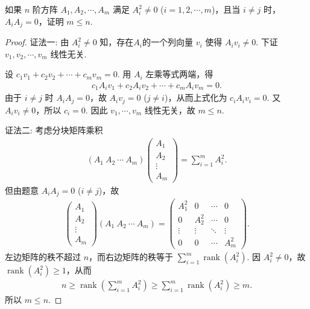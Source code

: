 \documentclass[../../main.tex]{subfiles}%
\begin{document}
\begin{example}
如果 $n$ 阶方阵 $A_1, A_2, \cdots, A_m$ 满足 $A_i^2 \neq 0$ ($i = 1, 2, \cdots, m$)，且当 $i \neq j$ 时，$A_i A_j = 0$，证明 $m \leqslant n$.
\end{example}
\begin{proof}

{\color{blue}证法一:}
由 $A_i^2 \neq 0$ 知，存在$A_i$的一个列向量 $v_i$ 使得 $A_i v_i \neq 0$. 下证 $v_1, v_2, \cdots, v_m$ 线性无关.

设 $c_1 v_1 + c_2 v_2 + \cdots + c_m v_m = 0$. 用 $A_i$ 左乘等式两端，得
\begin{align*}
c_1 A_i v_1 + c_2 A_i v_2 + \cdots + c_m A_i v_m = 0.
\end{align*}
由于 $i \neq j$ 时 $A_i A_j = 0$，故 $A_i v_j = 0$ ($j \neq i$)，从而上式化为 $c_i A_i v_i = 0$. 又 $A_i v_i \neq 0$，所以 $c_i = 0$. 因此 $v_1, \cdots, v_m$ 线性无关，故 $m \leqslant n$.

{\color{blue}证法二:}
考虑分块矩阵乘积
\begin{align*}
(A_1 \ A_2 \ \cdots \ A_m) \begin{pmatrix}
A_1 \\ A_2 \\ \vdots \\ A_m
\end{pmatrix} = \sum_{i=1}^m A_i^2.
\end{align*}
但由题意 $A_i A_j = 0$ ($i \neq j$)，故
\begin{align*}
\begin{pmatrix}
A_1 \\ A_2 \\ \vdots \\ A_m
\end{pmatrix} (A_1 \ A_2 \ \cdots \ A_m) =
\begin{pmatrix}
A_1^2 & 0 & \cdots & 0 \\
0 & A_2^2 & \cdots & 0 \\
\vdots & \vdots & \ddots & \vdots \\
0 & 0 & \cdots & A_m^2
\end{pmatrix}.
\end{align*}
左边矩阵的秩不超过 $n$，而右边矩阵的秩等于 $\sum_{i=1}^m \operatorname{rank}(A_i^2)$. 因 $A_i^2 \neq 0$，故 $\operatorname{rank}(A_i^2) \geqslant 1$，从而
\begin{align*}
n \geqslant \operatorname{rank}\left( \sum_{i=1}^m A_i^2 \right) \geqslant \sum_{i=1}^m \operatorname{rank}(A_i^2) \geqslant m.
\end{align*}
所以 $m \leqslant n$.
\end{proof}
\end{document}
